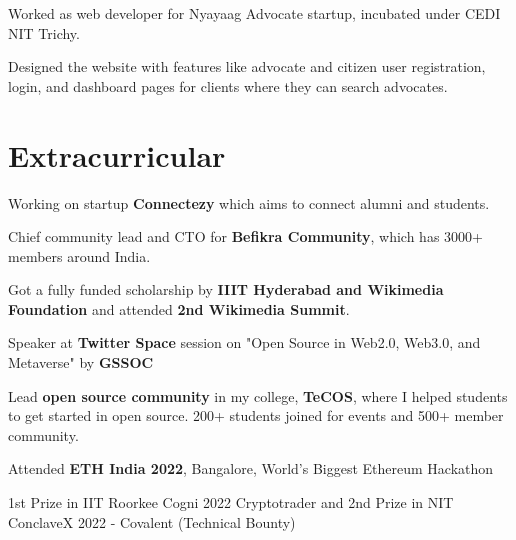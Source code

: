 \documentclass[]{deedy-resume-openfont}
\begin{document}
\begin{minipage}[t]{0.69\textwidth}
\hfill {}
\begin{tightemize}
    \item Worked as web developer for Nyayaag Advocate startup, incubated under CEDI NIT Trichy.
    \item Designed the website with features like advocate and citizen user registration, login, and dashboard pages for clients where they can search advocates.
\end{tightemize}

\sectionsep

\section{Extracurricular}

\begin{tightemize}
    \item Working on startup \textbf{Connectezy} which aims to connect alumni and students.
\end{tightemize}

\begin{tightemize}
    \item Chief community lead and CTO for \textbf{Befikra Community}, which has 3000+ members around India.
\end{tightemize}

\begin{tightemize}
    \item Got a fully funded scholarship by \textbf{IIIT Hyderabad and Wikimedia Foundation} and attended \textbf{2nd Wikimedia Summit}.
\end{tightemize}

\begin{tightemize}
    \item Speaker at \textbf{Twitter Space} session on "Open Source in Web2.0, Web3.0, and Metaverse" by \textbf{GSSOC}
\end{tightemize}

\begin{tightemize}
    \item Lead \textbf{open source community} in my college, \textbf{TeCOS}, where I helped students to get started in open source. 200+ students joined for events and 500+ member community.
\end{tightemize}

\begin{tightemize}
    \item Attended \textbf{ETH India 2022}, Bangalore, World’s Biggest Ethereum Hackathon 
\end{tightemize}

\begin{tightemize}
    \item 1st Prize in IIT Roorkee Cogni 2022 Cryptotrader and 2nd Prize in NIT ConclaveX 2022 - Covalent (Technical Bounty)
\end{tightemize}

\sectionsep
\end{minipage} 
\end{document}
